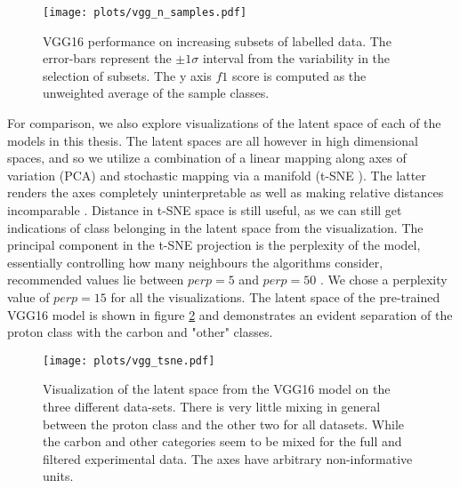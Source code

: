 \begin{figure}
\centering
\texttt{[image: plots/vgg\_n\_samples.pdf]}
\caption[VGG16 performance on labelled subsets]{VGG16 performance on increasing subsets of labelled data. The error-bars represent the $\pm 1\sigma$ interval from the variability in the selection of subsets. The y axis $f1$ score is computed as the unweighted average of the sample classes. }\label{fig:vgg_n_samples}
\end{figure}

For comparison, we also explore visualizations of the latent space of each of the models in this thesis. The latent spaces are all however in high dimensional spaces, and so we utilize a combination of a linear mapping along axes of variation (PCA) and stochastic mapping via a manifold (t-SNE \cite{VanDerMaaten2008}). The latter renders the axes completely uninterpretable as well as making relative distances incomparable \cite{VanDerMaaten2008}. Distance in t-SNE space is still useful, as we can still get indications of class belonging in the latent space from the visualization. The principal component in the t-SNE projection is the perplexity of the model, essentially controlling how many neighbours the algorithms consider, recommended values lie between $perp=5$ and $perp=50$ \cite{VanDerMaaten2008}. We chose a perplexity value of $perp=15$ for all the visualizations. The latent space of the pre-trained VGG16 model is shown in figure \ref{fig:vgg_tsne} and demonstrates an evident separation of the proton class with the carbon and "other" classes. 

\begin{figure}
\centering
\texttt{[image: plots/vgg\_tsne.pdf]}
\caption[VGG16 latent visualization]{Visualization of the latent space from the VGG16 model on the three different data-sets. There is very little mixing in general between the proton class and the other two for all datasets. While the carbon and other categories seem to be mixed for the full and filtered experimental data. The axes have arbitrary non-informative units.}\label{fig:vgg_tsne}
\end{figure}